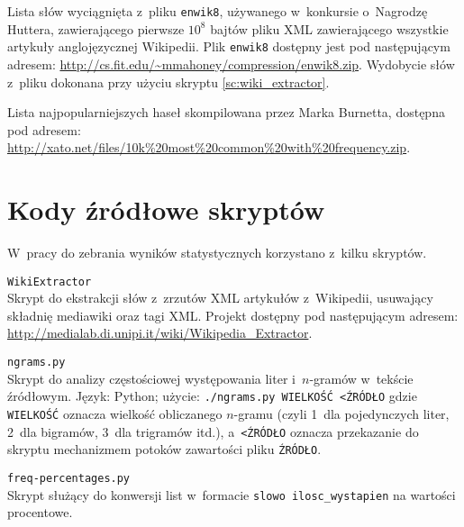 \begin{appendices}
\begin{myenumerate}
        \item {}\label{wl:wiki_wordlist} Lista słów
        wyciągnięta z~pliku \texttt{enwik8}, używanego w~konkursie o~Nagrodzę
        Huttera, zawierającego pierwsze $10^8$ bajtów pliku XML zawierającego
        wszystkie artykuły anglojęzycznej \mbox{Wikipedii}. Plik
        \texttt{enwik8} dostępny jest pod następującym adresem:
        \url{http://cs.fit.edu/~mmahoney/compression/enwik8.zip}. Wydobycie
        słów z~pliku dokonana przy użyciu skryptu \ref{sc:wiki_extractor}.

        \item {}\label{wl:xato_passwords} Lista
         najpopularniejszych haseł skompilowana przez Marka
        Burnetta, dostępna pod adresem:
        \url{http://xato.net/files/10k%20most%20common%20with%20frequency.zip}.

    \end{myenumerate}

\section{Kody źródłowe skryptów}
W~pracy do zebrania wyników statystycznych korzystano z~kilku skryptów.

\begin{myenumerate}

    \item {}\label{sc:wiki_extractor}
    \texttt{WikiExtractor} \\
    Skrypt do ekstrakcji słów z~zrzutów XML artykułów z~Wikipedii, usuwający
    składnię mediawiki oraz tagi XML. Projekt dostępny pod następującym
    \mbox{adresem}: \url{http://medialab.di.unipi.it/wiki/Wikipedia_Extractor}.

    \item {}\label{sc:ngrams_counter}
    \texttt{ngrams.py} \\
    Skrypt do analizy częstościowej występowania liter i~$n$-gramów w~tekście
    źródłowym. Język: Python; użycie: \texttt{./ngrams.py WIELKOŚĆ <ŹRÓDŁO}
    gdzie \texttt{WIELKOŚĆ} oznacza wielkość obliczanego $n$-gramu (czyli 1~dla
    pojedynczych liter, 2~dla bigramów, 3~dla trigramów itd.),
    a~\texttt{<ŹRÓDŁO} oznacza przekazanie do skryptu mechanizmem potoków
    zawartości pliku \texttt{ŹRÓDŁO}.
    

    \pagebreak
    \item {}\label{sc:freq_percentages}
    \texttt{freq-percentages.py} \\
    Skrypt służący do konwersji list w~formacie \texttt{slowo ilosc\_wystapien}
    na wartości procentowe.
    

\end{myenumerate}

\end{appendices}

